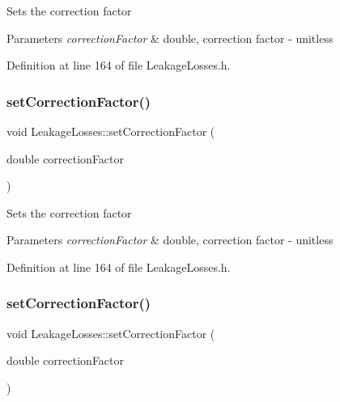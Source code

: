 Sets the correction factor 
\begin{DoxyParams}{Parameters}
{\em correction\+Factor} & double, correction factor -\/ unitless \\
\hline
\end{DoxyParams}


Definition at line 164 of file Leakage\+Losses.\+h.

\mbox{\label{class_leakage_losses_a1af53750d5d9573dffa8674b3479e8d6}} 
\subsubsection{\texorpdfstring{set\+Correction\+Factor()}{setCorrectionFactor()}\hspace{0.1cm}{\footnotesize\ttfamily [2/3]}}
{\footnotesize\ttfamily void Leakage\+Losses\+::set\+Correction\+Factor (\begin{DoxyParamCaption}\item[{double}]{correction\+Factor }\end{DoxyParamCaption})\hspace{0.3cm}{\ttfamily [inline]}}

Sets the correction factor 
\begin{DoxyParams}{Parameters}
{\em correction\+Factor} & double, correction factor -\/ unitless \\
\hline
\end{DoxyParams}


Definition at line 164 of file Leakage\+Losses.\+h.

\mbox{\label{class_leakage_losses_a1af53750d5d9573dffa8674b3479e8d6}} 
\subsubsection{\texorpdfstring{set\+Correction\+Factor()}{setCorrectionFactor()}\hspace{0.1cm}{\footnotesize\ttfamily [3/3]}}
{\footnotesize\ttfamily void Leakage\+Losses\+::set\+Correction\+Factor (\begin{DoxyParamCaption}\item[{double}]{correction\+Factor }\end{DoxyParamCaption})\hspace{0.3cm}{\ttfamily [inline]}}

